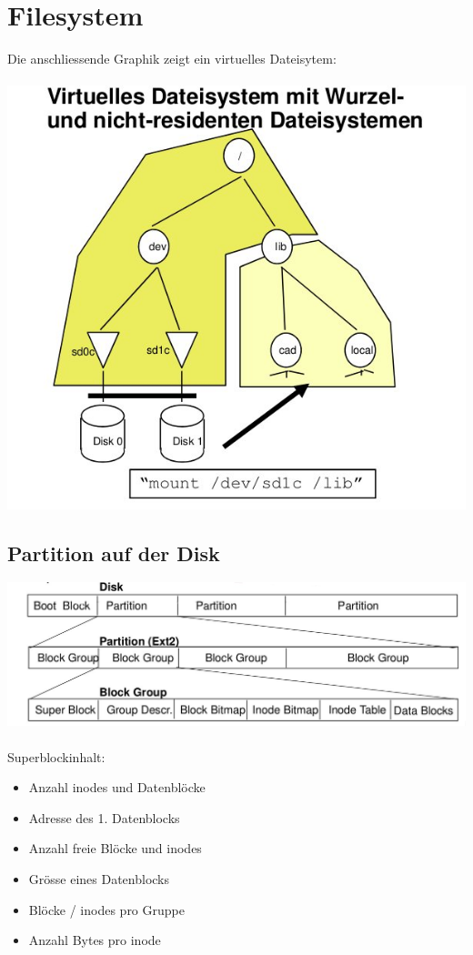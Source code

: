 \documentclass[a4paper, 10pt]{article}
\begin{document}
\newpage
\section{Filesystem}
Die anschliessende Graphik zeigt ein virtuelles Dateisytem:\\
\\
\includegraphics[scale=0.4]{Dateisystem.jpg}\\

\subsection{Partition auf der Disk}
\includegraphics[scale=0.3]{Partition_HD.jpg}\\
\\
Superblockinhalt:
\begin{itemize}
\item Anzahl inodes und Datenbl\"ocke
\item Adresse des 1. Datenblocks
\item Anzahl freie Bl\"ocke und inodes
\item Gr\"osse eines Datenblocks
\item Bl\"ocke / inodes pro Gruppe
\item Anzahl Bytes pro inode
\end{itemize}
\end{document}
